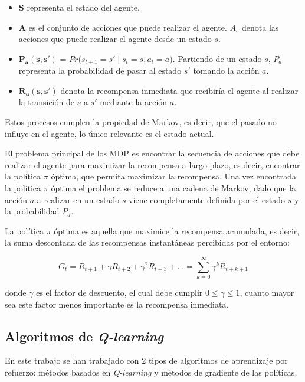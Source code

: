 \begin{itemize}
	\item \textbf{S} representa el estado del agente.
	\item \textbf{A} es el conjunto de acciones que puede realizar el agente. $A_s$ denota las acciones que puede realizar el agente desde un estado $s$.
	\item \textbf{$\boldsymbol{P_a(s,s')}$} = $Pr\big(s_{t+1} = s' \;|\; s_t = s , a_t = a  \big)$. Partiendo de un estado $s$, $P_a$ representa la probabilidad de pasar al estado $s'$ tomando la acción $a$.
	\item \textbf{$\boldsymbol{R_a(s,s')}$} denota la recompensa inmediata que recibiría el agente al realizar la transición de $s$ a $s'$ mediante la acción $a$.
\end{itemize}

Estos procesos cumplen la propiedad de Markov, es decir, que el pasado no influye en el agente, lo único relevante es el estado actual.

El problema principal de los MDP es encontrar la secuencia de acciones que debe realizar el agente para maximizar la recompensa a largo plazo, es decir, encontrar la política $\pi$ 
óptima, que permita maximizar la recompensa. Una vez encontrada la política $\pi$ óptima el problema se reduce a una cadena de Markov, dado que la acción $a$ a realizar en un estado $s$ viene completamente definida por el estado $s$ y la probabilidad $P_a$. 

La política $\pi$ óptima es aquella que maximice la recompensa acumulada, es decir, la suma descontada de las recompensas instantáneas percibidas por el entorno:

\begin{equation}
	G_t = R_{t+1} + \gamma R_{t+2} + \gamma^2 R_{t+3} + ... = \sum_{k=0}^{\infty}\gamma^k R_{
	t+k+1}
\end{equation}

donde $\gamma$ es el factor de descuento, el cual debe cumplir $0 \le \gamma \le 1$, cuanto mayor sea este factor menos importante es la recompensa inmediata. 


\subsection{Algoritmos de \textit{Q-learning}}
En este trabajo se han trabajado con 2 tipos de algoritmos de aprendizaje por refuerzo: métodos basados en \textit{Q-learning} y métodos de gradiente de las políticas.


